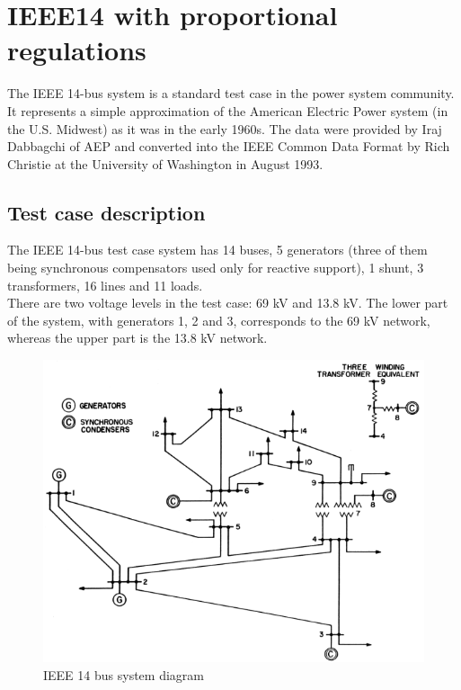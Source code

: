 \documentclass[a4paper, 12pt]{report}
\begin{document}
\chapter{IEEE14 with proportional regulations}

The IEEE 14-bus system is a standard test case in the power system community. It represents a simple approximation of the American Electric Power system (in the U.S. Midwest) as it was in the early 1960s. The data were provided by Iraj Dabbagchi of AEP and converted into the IEEE Common Data Format by Rich Christie at the University of Washington in August 1993.

\section{Test case description}

The IEEE 14-bus test case system has 14 buses, 5 generators (three of them being synchronous compensators used only for reactive support), 1 shunt, 3 transformers, 16 lines and 11 loads.\\
There are two voltage levels in the test case: 69 kV and 13.8 kV. The lower part of the system, with generators 1, 2 and 3, corresponds to the 69 kV network, whereas the upper part is the 13.8 kV network.

\begin{figure}[H]
  \includegraphics[width=\textwidth]{Single-line-diagram-of-IEEE-14-bus-system.png}
  \caption{IEEE 14 bus system diagram}
\end{figure}
\end{document}
